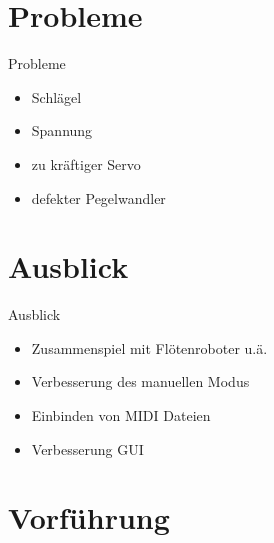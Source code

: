 \section{Probleme}

\begin{frame}{Probleme}
\begin{itemize}
\item Schlägel
\item Spannung
\item zu kräftiger Servo
\item defekter Pegelwandler
\end{itemize}
\end{frame}

\section{Ausblick}

\begin{frame}{Ausblick}
\begin{itemize}
\item Zusammenspiel mit Flötenroboter u.ä.
\item Verbesserung des manuellen Modus
\item Einbinden von MIDI Dateien
\item Verbesserung GUI
\end{itemize}
\end{frame}

\section{Vorführung}
\begin{frame}[plain]

\end{frame}
